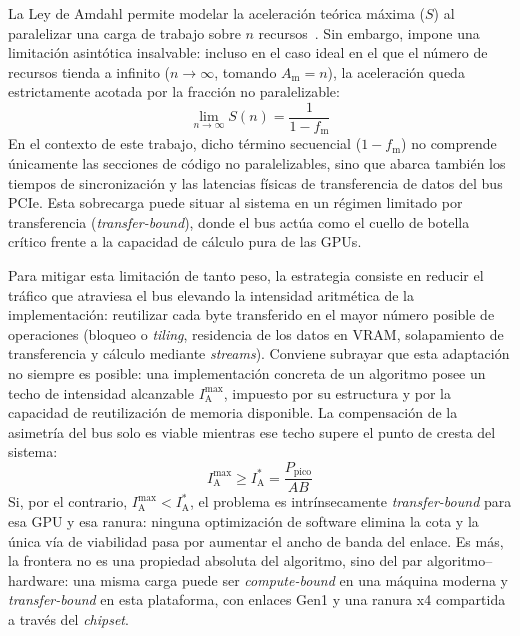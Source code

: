 \documentclass[a4paper,11pt]{article}
\begin{document}
La Ley de Amdahl permite modelar la aceleración teórica máxima ($S$) al paralelizar una carga de trabajo sobre $n$ recursos~\cite{amdahl1967}. Sin
embargo, impone una limitación asintótica insalvable: incluso en el caso ideal en el que el número de recursos tienda a
infinito ($n \to \infty$, tomando $A_{\text{m}} = n$), la aceleración queda estrictamente acotada por la fracción no paralelizable:
\begin{equation}\label{eq:amdahl_limite}
    \lim_{n \to \infty} S(n) = \frac{1}{1 - f_{\text{m}}}
\end{equation}
En el contexto de este trabajo, dicho término secuencial ($1 - f_{\text{m}}$) no comprende únicamente las secciones de código
no paralelizables, sino que abarca también los tiempos de sincronización y las latencias físicas de transferencia
de datos del bus PCIe. Esta sobrecarga puede situar al sistema en un régimen limitado por transferencia (\textit{transfer-bound}),
donde el bus actúa como el cuello de botella crítico frente a la capacidad de cálculo pura de las GPUs.

Para mitigar esta limitación de tanto peso, la estrategia consiste en reducir el tráfico que atraviesa el bus elevando la
intensidad aritmética de la implementación: reutilizar cada byte transferido en el mayor número posible de operaciones
(bloqueo o \textit{tiling}, residencia de los datos en VRAM, solapamiento de transferencia y cálculo mediante \textit{streams}).
Conviene subrayar que esta adaptación no siempre es posible: una implementación concreta de un algoritmo posee un techo de
intensidad alcanzable $I_{\text{A}}^{\max}$, impuesto por su estructura y por la capacidad de reutilización de memoria
disponible. La compensación de la asimetría del bus solo es viable mientras ese techo supere el punto de cresta del sistema:
\begin{equation}\label{eq:i_max}
    I_{\text{A}}^{\max} \ge I_{\text{A}}^* = \frac{P_{\text{pico}}}{AB}
\end{equation}
Si, por el contrario, $I_{\text{A}}^{\max} < I_{\text{A}}^*$, el problema es intrínsecamente \textit{transfer-bound} para esa
GPU y esa ranura: ninguna optimización de software elimina la cota y la única vía de viabilidad pasa por aumentar el ancho de
banda del enlace. Es más, la frontera no es una propiedad absoluta del algoritmo, sino del par algoritmo--hardware: una misma
carga puede ser \textit{compute-bound} en una máquina moderna y \textit{transfer-bound} en esta plataforma, con enlaces Gen1
y una ranura x4 compartida a través del \textit{chipset}.
\end{document}
